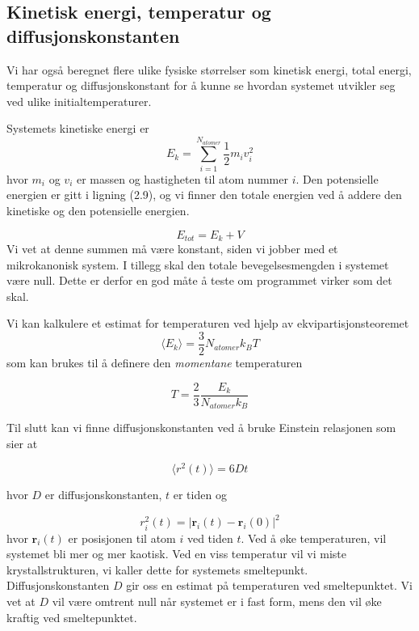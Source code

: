 \documentclass[paper=a4, fontsize=11pt]{scrartcl} %
\numberwithin{equation}{section} %
\numberwithin{figure}{section} %
\numberwithin{table}{section} %
\begin{document}
\subsection{Kinetisk energi, temperatur og diffusjonskonstanten}
Vi har også beregnet flere ulike fysiske størrelser som kinetisk energi, total energi, temperatur og diffusjonskonstant for å kunne se hvordan systemet utvikler seg ved ulike initialtemperaturer. 

Systemets kinetiske energi er 
\begin{equation}
E_k = \sum_{i=1}^{N_{atomer}} \frac{1}{2}m_iv_i^2
\end{equation}
hvor $m_i$ og $v_i$ er massen og hastigheten til atom nummer $i$. Den potensielle energien er gitt i ligning (2.9), og vi finner den totale energien ved å addere den kinetiske og den potensielle energien. 

\begin{equation}
E_{tot} =  E_k + V
\end{equation}
Vi vet at denne summen må være konstant, siden vi jobber med et mikrokanonisk system. I tillegg skal den totale bevegelsesmengden i systemet være null. Dette er derfor en god måte å teste om programmet virker som det skal.

Vi kan kalkulere et estimat for temperaturen ved hjelp av ekvipartisjonsteoremet 
\begin{equation}
\langle E_k \rangle = \frac{3}{2}N_{atomer} k_B T
\end{equation}
som kan brukes til å definere den \textit{momentane} temperaturen

\begin{equation}
T = \frac{2}{3}\frac{E_k}{N_{atomer} k_B}
\end{equation}

Til slutt kan vi finne diffusjonskonstanten ved å bruke Einstein relasjonen som sier at

\begin{equation}
\langle r^2(t) \rangle = 6 D t
\end{equation}

hvor $D$ er diffusjonskonstanten, $t$ er tiden og

\begin{equation}
r_i^2 (t) = | \textbf{r}_i (t) - \textbf{r}_i (0) |^2
\end{equation} 
hvor $\textbf{r}_i (t)$ er posisjonen til atom $i$ ved tiden $t$. Ved å øke temperaturen, vil systemet bli mer og mer kaotisk. Ved en viss temperatur vil vi miste krystallstrukturen, vi kaller dette for systemets smeltepunkt. Diffusjonskonstanten $D$ gir oss en estimat på temperaturen ved smeltepunktet. Vi vet at $D$ vil være omtrent null når systemet er i fast form, mens den vil øke kraftig ved smeltepunktet.\\
\end{document}
